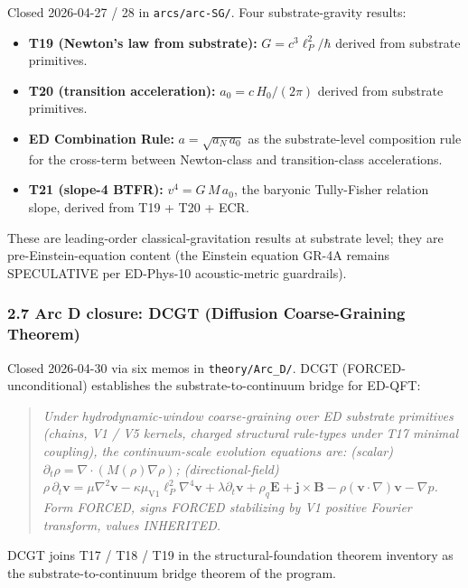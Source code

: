 \documentclass[
]{article}
\providecommand{\tightlist}{%
  \setlength{\itemsep}{0pt}\setlength{\parskip}{0pt}}
\begin{document}
Closed 2026-04-27 / 28 in \texttt{arcs/arc-SG/}. Four substrate-gravity
results:

\begin{itemize}
\tightlist
\item
  \textbf{T19 (Newton's law from substrate):} \(G = c^3\ell_P^2/\hbar\)
  derived from substrate primitives.
\item
  \textbf{T20 (transition acceleration):} \(a_0 = c\,H_0/(2\pi)\)
  derived from substrate primitives.
\item
  \textbf{ED Combination Rule:} \(a = \sqrt{a_N\,a_0}\) as the
  substrate-level composition rule for the cross-term between
  Newton-class and transition-class accelerations.
\item
  \textbf{T21 (slope-4 BTFR):} \(v^4 = G\,M\,a_0\), the baryonic
  Tully-Fisher relation slope, derived from T19 + T20 + ECR.
\end{itemize}

These are leading-order classical-gravitation results at substrate
level; they are pre-Einstein-equation content (the Einstein equation
GR-4A remains SPECULATIVE per ED-Phys-10 acoustic-metric guardrails).

\subsubsection{2.7 Arc D closure: DCGT (Diffusion Coarse-Graining
Theorem)}\label{arc-d-closure-dcgt-diffusion-coarse-graining-theorem}

Closed 2026-04-30 via six memos in \texttt{theory/Arc\_D/}. DCGT
(FORCED-unconditional) establishes the substrate-to-continuum bridge for
ED-QFT:

\begin{quote}
\emph{Under hydrodynamic-window coarse-graining over ED substrate
primitives (chains, V1 / V5 kernels, charged structural rule-types under
T17 minimal coupling), the continuum-scale evolution equations are:
(scalar) \(\partial_t\rho = \nabla\cdot(M(\rho)\nabla\rho)\);
(directional-field)
\(\rho\,\partial_t\mathbf{v} = \mu\nabla^2\mathbf{v} - \kappa\mu_\mathrm{V1}\ell_P^2\nabla^4\mathbf{v} + \lambda\partial_t\mathbf{v} + \rho_q\mathbf{E} + \mathbf{j}\times\mathbf{B} - \rho(\mathbf{v}\cdot\nabla)\mathbf{v} - \nabla p\).
Form FORCED, signs FORCED stabilizing by V1 positive Fourier transform,
values INHERITED.}
\end{quote}

DCGT joins T17 / T18 / T19 in the structural-foundation theorem
inventory as the substrate-to-continuum bridge theorem of the program.
\end{document}

